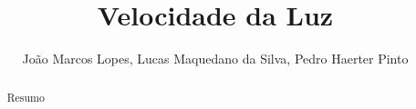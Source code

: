 \documentclass[a4paper,10pt]{article}
\author{João Marcos Lopes, Lucas Maquedano da Silva, Pedro Haerter Pinto}
\title{Velocidade da Luz}
\begin{document}
\maketitle
\tableofcontents

\begin{abstract}
Resumo
\end{abstract}
\end{document}
